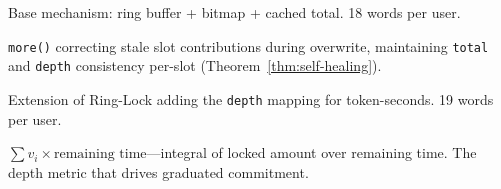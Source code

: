 \documentclass[10pt,a4paper,twocolumn]{article}
\theoremstyle{definition}
\theoremstyle{plain}
\theoremstyle{remark}
\begin{document}
\begin{description}[style=nextline, font=\normalfont\bfseries, leftmargin=1.5em]
\item[Ring-Lock] Base mechanism: ring buffer + bitmap + cached total. 18 words per user.

\item[Self-Healing] \texttt{more()} correcting stale slot contributions during overwrite, maintaining \texttt{total} and \texttt{depth} consistency per-slot (Theorem~\ref{thm:self-healing}).

\item[Time-Lock] Extension of Ring-Lock adding the \texttt{depth} mapping for token-seconds. 19 words per user.

\item[Token-Seconds] $\sum v_i \times \text{remaining time}$---integral of locked amount over remaining time. The depth metric that drives graduated commitment.

\end{description}

\clearpage
\ifodd\value{page}\else\thispagestyle{empty}\null\clearpage\fi
\end{document}
